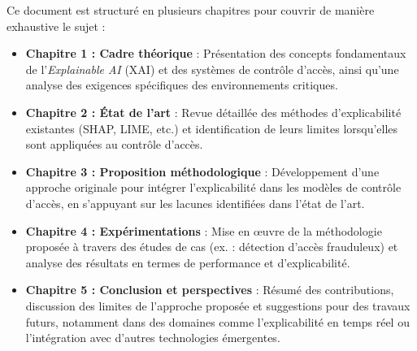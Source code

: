 Ce document est structuré en plusieurs chapitres pour couvrir de manière exhaustive le sujet :

\begin{itemize}
    \item \textbf{Chapitre 1 : Cadre théorique} : Présentation des concepts fondamentaux de l'\textit{Explainable AI} (XAI) et des systèmes de contrôle d'accès, ainsi qu'une analyse des exigences spécifiques des environnements critiques.
    \item \textbf{Chapitre 2 : État de l'art} : Revue détaillée des méthodes d'explicabilité existantes (SHAP, LIME, etc.) et identification de leurs limites lorsqu'elles sont appliquées au contrôle d'accès.
    \item \textbf{Chapitre 3 : Proposition méthodologique} : Développement d'une approche originale pour intégrer l'explicabilité dans les modèles de contrôle d'accès, en s'appuyant sur les lacunes identifiées dans l'état de l'art.
    \item \textbf{Chapitre 4 : Expérimentations} : Mise en œuvre de la méthodologie proposée à travers des études de cas (ex. : détection d'accès frauduleux) et analyse des résultats en termes de performance et d'explicabilité.
    \item \textbf{Chapitre 5 : Conclusion et perspectives} : Résumé des contributions, discussion des limites de l'approche proposée et suggestions pour des travaux futurs, notamment dans des domaines comme l'explicabilité en temps réel ou l'intégration avec d'autres technologies émergentes.
\end{itemize}



